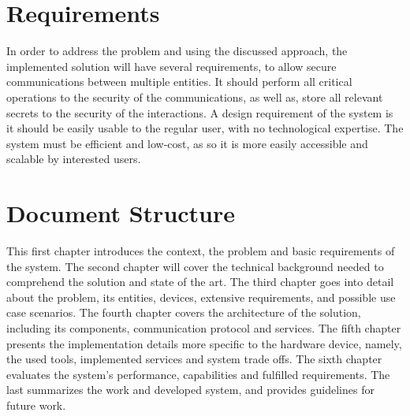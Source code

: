 \section{Requirements}\label{chap:intro:requirements}

In order to address the problem and using the discussed approach, the implemented solution will have several requirements, to allow secure communications between multiple entities.
It should perform all critical operations to the security of the communications, as well as, store all relevant secrets to the security of the interactions.
A design requirement of the system is it should be easily usable to the regular user, with no technological expertise. The system must be efficient and low-cost, as so it is more easily accessible and scalable by interested users.

\section{Document Structure}\label{chap:intro:doc}

This first chapter introduces the context, the problem and basic requirements of the system.
The second chapter will cover the technical background needed to comprehend the solution and state of the art.
The third chapter goes into detail about the problem, its entities, devices, extensive requirements, and possible use case scenarios.
The fourth chapter covers the architecture of the solution, including its components, communication protocol and services.
The fifth chapter presents the implementation details more specific to the hardware device, namely, the used tools, implemented services and system trade offs. The sixth chapter evaluates the system's performance, capabilities and fulfilled requirements. The last summarizes the work and developed system, and provides guidelines for future work.
